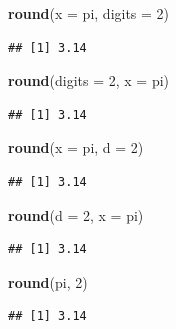 \documentclass[
]{book}
\newenvironment{Shaded}{\begin{snugshade}}{\end{snugshade}}
\newcommand{\DataTypeTok}[1]{\textcolor[rgb]{0.13,0.29,0.53}{#1}}
\newcommand{\DecValTok}[1]{\textcolor[rgb]{0.00,0.00,0.81}{#1}}
\newcommand{\KeywordTok}[1]{\textcolor[rgb]{0.13,0.29,0.53}{\textbf{#1}}}
\newcommand{\NormalTok}[1]{#1}
\begin{document}
\begin{Shaded}
\begin{Highlighting}[]
\KeywordTok{round}\NormalTok{(}\DataTypeTok{x =}\NormalTok{ pi, }\DataTypeTok{digits =} \DecValTok{2}\NormalTok{)}
\end{Highlighting}
\end{Shaded}

\begin{verbatim}
## [1] 3.14
\end{verbatim}

\begin{Shaded}
\begin{Highlighting}[]
\KeywordTok{round}\NormalTok{(}\DataTypeTok{digits =} \DecValTok{2}\NormalTok{, }\DataTypeTok{x =}\NormalTok{ pi)}
\end{Highlighting}
\end{Shaded}

\begin{verbatim}
## [1] 3.14
\end{verbatim}

\begin{Shaded}
\begin{Highlighting}[]
\KeywordTok{round}\NormalTok{(}\DataTypeTok{x =}\NormalTok{ pi, }\DataTypeTok{d =} \DecValTok{2}\NormalTok{)}
\end{Highlighting}
\end{Shaded}

\begin{verbatim}
## [1] 3.14
\end{verbatim}

\begin{Shaded}
\begin{Highlighting}[]
\KeywordTok{round}\NormalTok{(}\DataTypeTok{d =} \DecValTok{2}\NormalTok{, }\DataTypeTok{x =}\NormalTok{ pi)}
\end{Highlighting}
\end{Shaded}

\begin{verbatim}
## [1] 3.14
\end{verbatim}

\begin{Shaded}
\begin{Highlighting}[]
\KeywordTok{round}\NormalTok{(pi, }\DecValTok{2}\NormalTok{)}
\end{Highlighting}
\end{Shaded}

\begin{verbatim}
## [1] 3.14
\end{verbatim}
\end{document}
